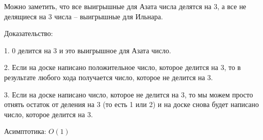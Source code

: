 \solutionSection

Можно заметить, что все выигрышные для Азата числа делятся на 3, 
а все не делящиеся на 3 числа -- выигрышные для Ильнара.

Доказательство:

1. 0 делится на 3 и это выигрышное для Азата число.

2. Если на доске написано положительное число, которое делится на 3,
то в результате любого хода получается число, которое не делится на 3.

3. Если на доске написано число, которое не делится на 3,
то мы можем просто отнять остаток от деления на 3 (то есть 1 или 2)
и на доске снова будет написано число, которое делится на 3.

Асимптотика: $O(1)$

\codeExample

